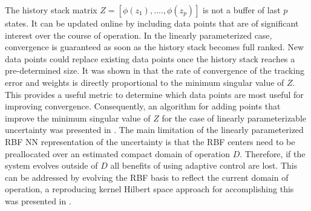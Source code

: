 The history stack matrix $Z=[\phi(z_1),....,\phi(z_p)]$ is not a buffer of last $p$ states. It can be updated online by including data points that are of significant interest over the course of operation. In the linearly parameterized case, convergence is guaranteed as soon as the history stack becomes full ranked. New data points could replace existing data points once the history stack reaches a pre-determined size. It was shown in \cite{chowdhary:acc11:2011b} that the rate of convergence of the tracking error and weights is directly proportional to the minimum singular value of $Z$. This provides a useful metric to determine which data points are most useful for improving convergence. Consequently, an algorithm for adding points that improve the minimum singular value of $Z$ for the case of linearly parameterizable uncertainty was presented in \cite{chowdhary:acc11:2011b}. %
The main limitation of the linearly parameterized RBF NN representation of the uncertainty is that the RBF centers need to be preallocated over an estimated compact domain of operation $D$. Therefore, if the system evolves outside of $D$ all benefits of using adaptive control are lost. This can be addressed by evolving the RBF basis to reflect the current domain of operation, a reproducing kernel Hilbert space approach for accomplishing this was presented in \cite{Kingravi:TNN:2012}.

